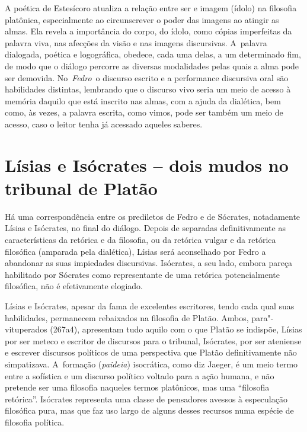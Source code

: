 A poética de Estesícoro atualiza a relação entre ser e imagem (ídolo) na
filosofia platônica, especialmente ao circunscrever o poder das imagens
ao atingir as almas. Ela revela a importância do corpo, do ídolo, como
cópias imperfeitas da palavra viva, nas afecções da visão e nas imagens
discursivas. A~palavra dialogada, poética e logográfica, obedece, cada
uma delas, a um determinado fim, de modo que o diálogo percorre as
diversas modalidades pelas quais a alma pode ser demovida.
No~\emph{Fedro}~o discurso escrito e a performance discursiva oral são
habilidades distintas, lembrando que o discurso vivo seria um meio de
acesso à memória daquilo que está inscrito nas almas, com a ajuda da
dialética, bem como, às vezes, a palavra escrita, como vimos, pode ser
também um meio de acesso, caso o leitor tenha já acessado aqueles
saberes.

 

\section{Lísias e Isócrates -- dois mudos no tribunal de Platão}

 

Há uma correspondência entre os prediletos de Fedro e de Sócrates,
notadamente Lísias e Isócrates, no final do diálogo. Depois de separadas
definitivamente as características da retórica e da filosofia, ou da
retórica vulgar e da retórica filosófica (amparada pela dialética),
Lísias será aconselhado por Fedro a abandonar as suas impiedades
discursivas. Isócrates, a seu lado, embora pareça habilitado por
Sócrates como representante de uma retórica potencialmente filosófica,
não é efetivamente elogiado.

Lísias e Isócrates, apesar da fama de excelentes escritores, tendo cada
qual suas habilidades, permanecem rebaixados na filosofia de Platão.
Ambos, para"-vituperados (267a4), apresentam tudo aquilo com o que Platão
se indispõe, Lísias por ser meteco e escritor de discursos para o
tribunal, Isócrates, por ser ateniense e escrever discursos políticos de
uma perspectiva que Platão definitivamente não simpatizava. A~formação
(\emph{paideia}) isocrática, como diz Jaeger, é um meio termo entre a
sofística e um discurso político voltado para a ação humana, e não
pretende ser uma filosofia naqueles termos platônicos, mas uma
``filosofia retórica''. Isócrates representa uma classe de pensadores
avessos à especulação filosófica pura, mas que faz uso largo de alguns
desses recursos numa espécie de filosofia política.

